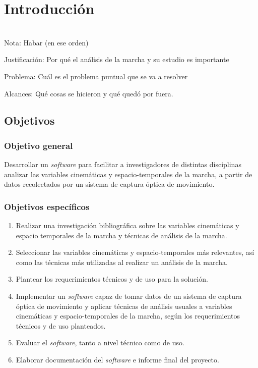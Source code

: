 \chapter{Introducción}

 \\

Nota: Habar (en ese orden) 

Justificación: Por qué el análisis de la marcha y su estudio es importante

Problema: Cuál es el problema puntual que se va a resolver 

Alcances: Qué cosas se hicieron y qué quedó por fuera. 


\section{Objetivos}

\subsection{Objetivo general}

Desarrollar un \emph{software} para facilitar a investigadores de distintas disciplinas analizar las variables cinemáticas y espacio-temporales de la marcha, a partir de datos recolectados por un sistema de captura óptica de movimiento.

\subsection{Objetivos específicos}

\begin{enumerate}
    \item Realizar una investigación bibliográfica sobre las variables cinemáticas y espacio temporales de la marcha y técnicas de análisis de la marcha.
    \item Seleccionar las variables cinemáticas y espacio-temporales más relevantes, así como las técnicas más utilizadas al realizar un análisis de la marcha. 
    \item Plantear los requerimientos técnicos y de uso para la solución. 
    \item Implementar un \emph{software} capaz de tomar datos de un sistema de captura óptica de movimiento y aplicar técnicas de análisis usuales a variables cinemáticas y espacio-temporales de la marcha, según los requerimientos técnicos y de uso planteados.
    \item Evaluar el \emph{software}, tanto a nivel técnico como de uso.
    \item Elaborar documentación del \emph{software} e informe final del proyecto.
\end{enumerate}


